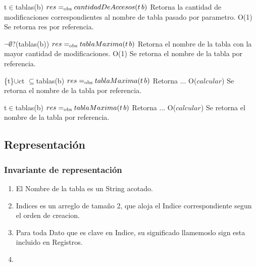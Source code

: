  {t$\in$tablas(b)}
 {$res =_{\mathrm{obs}} cantidadDeAccesos(t\,b)$}
 {Retorna la cantidad de modificaciones correspondientes al nombre de tabla pasado por parametro.}
 {O(1)}
 {Se retorna res por referencia.} 

 {$\neg\emptyset$?(tablas(b))}
 {$res =_{\mathrm{obs}} tablaMaxima(t\,b)$}
 {Retorna el nombre de la tabla con la mayor cantidad de modificaciones.}
 {O(1)}
 {Se retorna el nombre de la tabla por referencia.} 
  
 {\{t\}$\cup$ct $\subseteq$tablas(b)}
 {$res =_{\mathrm{obs}} tablaMaxima(t\,b)$}
 {Retorna ...}
 {O($calcular$)}
 {Se retorna el nombre de la tabla por referencia.}
  
 {t$\in$tablas(b)}
 {$res =_{\mathrm{obs}} tablaMaxima(t\,b)$}
 {Retorna ...}
 {O($calcular$)}
 {Se retorna el nombre de la tabla por referencia.}
  
 
 
\subsection{Representación}

{
}

\subsubsection*{Invariante de representación}

\begin{enumerate}
  \item El Nombre de la tabla es un String acotado.
  \item Indices es un arreglo de tamaño 2, que aloja el Indice correspondiente segun el orden de creacion.
  \item Para toda Dato que es clave en Indice, su significado llamemoslo sign esta incluido en Registros.
  \item 

\end{enumerate}


